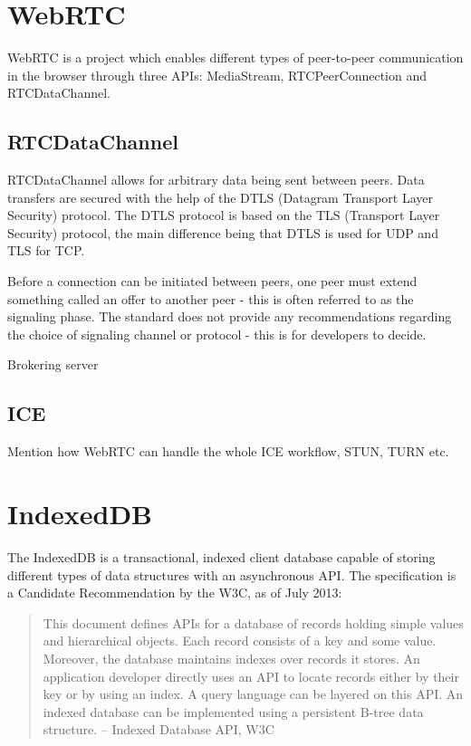 \section{WebRTC}
WebRTC is a project which enables different types of peer-to-peer communication in the browser through three APIs: MediaStream, RTCPeerConnection and RTCDataChannel.

\subsection{RTCDataChannel}
RTCDataChannel allows for arbitrary data being sent between peers. Data transfers are secured with the help of the DTLS (Datagram Transport Layer Security) protocol. The DTLS protocol is based on the TLS (Transport Layer Security) protocol, the main difference being that DTLS is used for UDP and TLS for TCP.

Before a connection can be initiated between peers, one peer must extend something called an offer to another peer - this is often referred to as the signaling phase. The standard does not provide any recommendations regarding the choice of signaling channel or protocol - this is for developers to decide.

Brokering server

\subsection{ICE}
Mention how WebRTC can handle the whole ICE workflow, STUN, TURN etc.

\section{IndexedDB}
The IndexedDB is a transactional, indexed client database capable of storing different types of data structures with an asynchronous API. The specification is a Candidate Recommendation by the W3C, as of July 2013:

\begin{quote}
This document defines APIs for a database of records holding simple values and hierarchical objects. Each record consists of a key and some value. Moreover, the database maintains indexes over records it stores. An application developer directly uses an API to locate records either by their key or by using an index. A query language can be layered on this API. An indexed database can be implemented using a persistent B-tree data structure.
– Indexed Database API, W3C
\end{quote}

